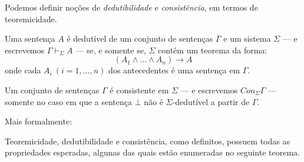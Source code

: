 Podemos definir noções de \textit{dedutibilidade} e \textit{consistência}, em
termos de teoremicidade. 

Uma sentença $A$ é dedutível de um conjunto de
sentenças $\Gamma$ e um sistema $\Sigma$ --- e escrevemos $\Gamma
\vdash_{\Sigma} A$ --- se, e somente se, $\Sigma$ contém um teorema da forma:
\begin{equation}
    (A_1 \wedge \ldots \wedge A_n) \rightarrow A
\end{equation}
onde cada $A_i~(i=1,\ldots,n)$ dos antecedentes é uma sentença em $\Gamma$.

Um conjunto de sentenças $\Gamma$ é consistente em $\Sigma$ --- e escrevemos
$Con_{\Sigma}\Gamma$ --- somente no caso em que a sentença $\bot$ não é
$\Sigma$-dedutível a partir de $\Gamma$.

Mais formalmente:

\begin{definition}[Dedutibilidade]
    
\end{definition}

\begin{definition}[Consistência]
    
\end{definition}

Teoremicidade, dedutibilidade e consistência, como definitos, possuem todas as
propriedades esperadas, algunas das quais estão enumeradas no seguinte teorema.

